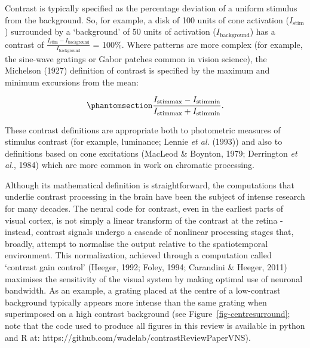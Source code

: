 \documentclass[
  letterpaper,
  DIV=11,
  numbers=noendperiod]{scrartcl}
\begin{document}
Contrast is typically specified as the percentage deviation of a uniform
stimulus from the background. So, for example, a disk of 100 units of
cone activation (\(I_{\mathrm{stim}}\)) surrounded by a `background' of
50 units of activation (\(I_{\mathrm{background}}\)) has a contrast of
\(\frac{I_{\mathrm{stim}} - I_{\mathrm{background}}}{I_{\mathrm{background}}}\)
= 100\%. Where patterns are more complex (for example, the sine-wave
gratings or Gabor patches common in vision science), the Michelson
(1927) definition of contrast is specified by the maximum and minimum
excursions from the mean:

\begin{equation}\phantomsection\label{eq-michelson}{\frac {I_{\mathrm{stimmax} }-I_{\mathrm{stimmin} }}{I_{\mathrm{stimmax} }+I_{\mathrm{stimmin} }}.}\end{equation}

These contrast definitions are appropriate both to photometric measures
of stimulus contrast (for example, luminance; Lennie \emph{et al.}
(1993)) and also to definitions based on cone excitations (MacLeod \&
Boynton, 1979; Derrington \emph{et al.}, 1984) which are more common in
work on chromatic processing.

Although its mathematical definition is straightforward, the
computations that underlie contrast processing in the brain have been
the subject of intense research for many decades. The neural code for
contrast, even in the earliest parts of visual cortex, is not simply a
linear transform of the contrast at the retina - instead, contrast
signals undergo a cascade of nonlinear processing stages that, broadly,
attempt to normalise the output relative to the spatiotemporal
environment. This normalization, achieved through a computation called
`contrast gain control' (Heeger, 1992; Foley, 1994; Carandini \& Heeger,
2011) maximises the sensitivity of the visual system by making optimal
use of neuronal bandwidth. As an example, a grating placed at the centre
of a low-contrast background typically appears more intense than the
same grating when superimposed on a high contrast background (see
Figure~\ref{fig-centresurround}; note that the code used to produce all
figures in this review is available in python and R at:
https://github.com/wadelab/contrastReviewPaperVNS).
\end{document}
